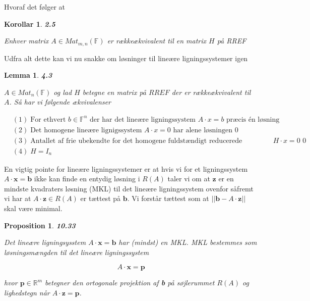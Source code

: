 \documentclass[paper=a4, fontsize=11pt]{scrartcl} %
\newtheorem*{korollar}{Korollar}
\newtheorem*{lemma}{Lemma}
\newtheorem*{proposition}{Proposition}
\newenvironment{cstmproposition}[1]{\begin{proposition} {\normalfont\textbf{#1}}}{\end{proposition}}
\newenvironment{cstmkorollar}[1]{\begin{korollar} {\normalfont\textbf{#1}}}{\end{korollar}}
\newenvironment{cstmlemma}[1]{\begin{lemma} {\normalfont\textbf{#1}}}{\end{lemma}}
\begin{document}
	Hvoraf det følger at
	
	\begin{cstmkorollar}{2.5}
		
		Enhver matrix $A \in Mat_{m,n}(\mathbb{F})$ er rækkeækvivalent til en matrix $H$ på RREF
		
	\end{cstmkorollar}
	
	Udfra alt dette kan vi nu snakke om løsninger til lineære ligningssystemer igen
	
	\begin{cstmlemma}{4.3}
		
		$A \in Mat_n(\mathbb{F})$ og lad $H$ betegne en matrix på $RREF$ der er rækkeækvivalent til $A$. Så har vi følgende ækvivalenser
		
		\begin{align*}
		&(1) \; \mbox{For ethvert } b \in \mathbb{F}^n \mbox{ der har det lineære ligningssystem } A \cdot x = b \mbox{ præcis én løsning}\\
		&(2) \; \mbox{Det homogene lineære lignigssystem } A \cdot x = 0 \mbox{ har alene løsningen } 0\\
		&(3) \; \mbox{Antallet af frie ubekendte for det homogene fuldstændigt reducerede ligningssystem } H \cdot x = 0 \mbox{ 0}\\
		&(4) \; H = I_n
		\end{align*}
		
		
		
	\end{cstmlemma}
	
	
	En vigtig pointe for lineære ligningssystemer er at hvis vi for et ligningssystem $A \cdot \textbf{x} = \textbf{b}$ ikke kan finde en entydig løsning i $R(A)$ taler vi om at $\textbf{z}$ er en mindste kvadraters løsning (MKL) til det lineære ligningssystem ovenfor såfremt vi har at $A \cdot \textbf{z} \in R(A)$ er tættest på $\textbf{b}$. Vi forstår tættest som at $||\textbf{b} - A \cdot \textbf{z}||$ skal være minimal. 
	
	\begin{cstmproposition}{10.33}
		
		Det lineære ligningsysstem $A \cdot \textbf{x} = \textbf{b}$ har (mindst) en MKL. MKL bestemmes som løsningsmængden til det lineære ligningssystem
		
		\[A \cdot \textbf{x} = \textbf{p}\]
		
		hvor $\textbf{p} \in \mathbb{R}^m$ betegner den ortogonale projektion af \textbf{b} på søjlerummet $R(A)$ og lighedstegn når $A \cdot \textbf{z} = \textbf{p}$.
	\end{cstmproposition}
	
\end{document}
